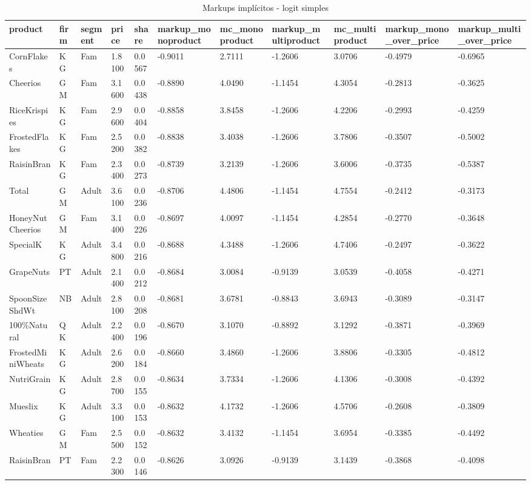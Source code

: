 \begin{table}[!htbp]
\centering
\caption{Markups implícitos - logit simples}
\label{tab:markups}
\scriptsize
\begin{tabular}{lllllllllll}
\hline
product & firm & segment & price & share & markup\_monoproduct & mc\_monoproduct & markup\_multiproduct & mc\_multiproduct & markup\_mono\_over\_price & markup\_multi\_over\_price
\\
\hline
CornFlakes & KG & Fam & 1.8100 & 0.0567 & -0.9011 & 2.7111 & -1.2606 & 3.0706 & -0.4979 & -0.6965
\\
Cheerios & GM & Fam & 3.1600 & 0.0438 & -0.8890 & 4.0490 & -1.1454 & 4.3054 & -0.2813 & -0.3625
\\
RiceKrispies & KG & Fam & 2.9600 & 0.0404 & -0.8858 & 3.8458 & -1.2606 & 4.2206 & -0.2993 & -0.4259
\\
FrostedFlakes & KG & Fam & 2.5200 & 0.0382 & -0.8838 & 3.4038 & -1.2606 & 3.7806 & -0.3507 & -0.5002
\\
RaisinBran & KG & Fam & 2.3400 & 0.0273 & -0.8739 & 3.2139 & -1.2606 & 3.6006 & -0.3735 & -0.5387
\\
Total & GM & Adult & 3.6100 & 0.0236 & -0.8706 & 4.4806 & -1.1454 & 4.7554 & -0.2412 & -0.3173
\\
HoneyNutCheerios & GM & Fam & 3.1400 & 0.0226 & -0.8697 & 4.0097 & -1.1454 & 4.2854 & -0.2770 & -0.3648
\\
SpecialK & KG & Adult & 3.4800 & 0.0216 & -0.8688 & 4.3488 & -1.2606 & 4.7406 & -0.2497 & -0.3622
\\
GrapeNuts & PT & Adult & 2.1400 & 0.0212 & -0.8684 & 3.0084 & -0.9139 & 3.0539 & -0.4058 & -0.4271
\\
SpoonSizeShdWt & NB & Adult & 2.8100 & 0.0208 & -0.8681 & 3.6781 & -0.8843 & 3.6943 & -0.3089 & -0.3147
\\
100\%Natural & QK & Adult & 2.2400 & 0.0196 & -0.8670 & 3.1070 & -0.8892 & 3.1292 & -0.3871 & -0.3969
\\
FrostedMiniWheats & KG & Adult & 2.6200 & 0.0184 & -0.8660 & 3.4860 & -1.2606 & 3.8806 & -0.3305 & -0.4812
\\
NutriGrain & KG & Adult & 2.8700 & 0.0155 & -0.8634 & 3.7334 & -1.2606 & 4.1306 & -0.3008 & -0.4392
\\
Mueslix & KG & Adult & 3.3100 & 0.0153 & -0.8632 & 4.1732 & -1.2606 & 4.5706 & -0.2608 & -0.3809
\\
Wheaties & GM & Fam & 2.5500 & 0.0152 & -0.8632 & 3.4132 & -1.1454 & 3.6954 & -0.3385 & -0.4492
\\
RaisinBran & PT & Fam & 2.2300 & 0.0146 & -0.8626 & 3.0926 & -0.9139 & 3.1439 & -0.3868 & -0.4098

\end{tabular}
\end{table}
